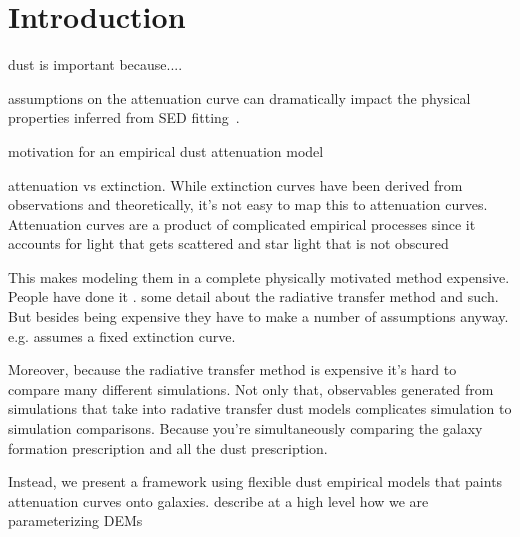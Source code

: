 \section{Introduction} \label{sec:intro} 


dust is important because....


assumptions on the attenuation curve can dramatically impact the physical
properties inferred from SED fitting~\citep[\eg][]{kriek2013, shivaei2015,
reddy2015, salim2020}. 


motivation for an empirical dust attenuation model

attenuation vs extinction. While extinction curves have been derived from
observations and theoretically, it's not easy to map this to attenuation
curves. Attenuation curves are a product of complicated empirical processes
since it accounts for light that gets scattered and star light that is not
obscured 

This makes modeling them in a complete physically motivated method expensive.
People have done it \cite{narayanan2018, trayford2020}. 
some detail about the
radiative transfer method and such. But besides being expensive they have to
make a number of assumptions anyway. e.g. \cite{narayanan2018} assumes a fixed
extinction curve. 

Moreover, because the radiative transfer method is expensive it's hard to
compare many different simulations. Not only that, observables generated from
simulations that take into radative transfer dust models complicates simulation
to simulation comparisons. Because you're simultaneously comparing the galaxy
formation prescription and all the dust prescription. 

Instead, we present a framework using flexible dust empirical models that
paints attenuation curves onto galaxies. describe at a high level how we are
parameterizing DEMs 

